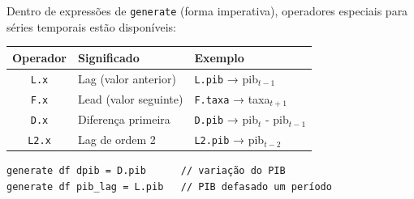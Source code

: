 Dentro de expressões de \lstinline{generate} (forma imperativa), operadores especiais
para séries temporais estão disponíveis:

\begin{center}
\begin{tabular}{cll}
\toprule
\textbf{Operador} & \textbf{Significado} & \textbf{Exemplo} \\
\midrule
\texttt{L.x}   & Lag (valor anterior)     & \texttt{L.pib}  → pib$_{t-1}$ \\
\texttt{F.x}   & Lead (valor seguinte)    & \texttt{F.taxa} → taxa$_{t+1}$ \\
\texttt{D.x}   & Diferença primeira       & \texttt{D.pib}  → pib$_t$ - pib$_{t-1}$ \\
\texttt{L2.x}  & Lag de ordem 2           & \texttt{L2.pib} → pib$_{t-2}$ \\
\bottomrule
\end{tabular}
\end{center}

\begin{lstlisting}[caption={Operadores de séries temporais}]
generate df dpib = D.pib      // variação do PIB
generate df pib_lag = L.pib   // PIB defasado um período
\end{lstlisting}
